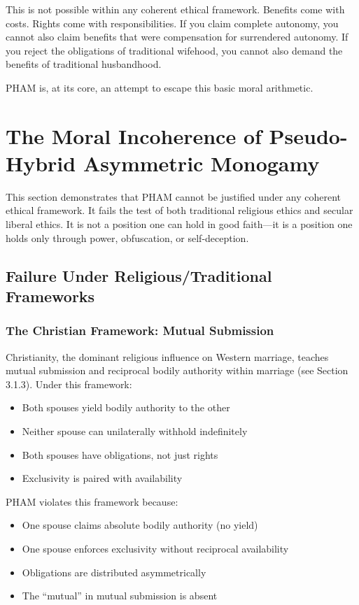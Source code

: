 \documentclass[12pt, letterpaper]{article}
\begin{document}
This is not possible within any coherent ethical framework. Benefits come with costs. Rights come with responsibilities. If you claim complete autonomy, you cannot also claim benefits that were compensation for surrendered autonomy. If you reject the obligations of traditional wifehood, you cannot also demand the benefits of traditional husbandhood.

PHAM is, at its core, an attempt to escape this basic moral arithmetic.

\section{The Moral Incoherence of Pseudo-Hybrid Asymmetric Monogamy}

This section demonstrates that PHAM cannot be justified under any coherent ethical framework. It fails the test of both traditional religious ethics and secular liberal ethics. It is not a position one can hold in good faith---it is a position one holds only through power, obfuscation, or self-deception.

\subsection{Failure Under Religious/Traditional Frameworks}

\subsubsection{The Christian Framework: Mutual Submission}

Christianity, the dominant religious influence on Western marriage, teaches mutual submission and reciprocal bodily authority within marriage (see Section 3.1.3). Under this framework:

\begin{itemize}
    \item Both spouses yield bodily authority to the other
    \item Neither spouse can unilaterally withhold indefinitely
    \item Both spouses have obligations, not just rights
    \item Exclusivity is paired with availability
\end{itemize}

PHAM violates this framework because:
\begin{itemize}
    \item One spouse claims absolute bodily authority (no yield)
    \item One spouse enforces exclusivity without reciprocal availability
    \item Obligations are distributed asymmetrically
    \item The ``mutual'' in mutual submission is absent
\end{itemize}
\end{document}
